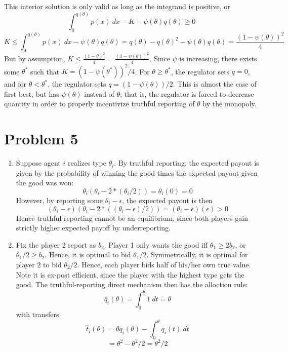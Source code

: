 \documentclass[10pt,letter]{article}
\begin{document}
\begin{enumerate}[label=(\alph*)]
This interior solution is only valid as long as the integrand is positive, or
\[ \int_0^{q(\theta)}p(x) \ dx - K - \psi(\theta) q(\theta) \ge 0 \]
\[ K \le \int_0^{q(\theta)}p(x) \ dx - \psi(\theta) q(\theta) = q(\theta) - q(\theta)^2 - \psi(\theta)q(\theta) = \frac{(1-\psi(\theta))^2}{4} \]
But by assumption, $K \le \frac{(1-\underline{\theta})^2}{4} = \frac{(1-\psi(\underline{\theta}))^2}{4}$. Since $\psi$ is increasing, there exists some $\theta^*$ such that $K = (1-\psi(\theta^*))^2/4$. For $\theta \ge \theta^*$, the regulator sets $q = 0$, and for $\theta < \theta^*$, the regulator sets $q = (1-\psi(\theta))/2$.
This is almost the case of first best, but has $\psi(\theta)$ instead of $\theta$; that is, the regulator is forced to decrease quantity in order to properly incentivize truthful reporting of $\theta$ by the monopoly.
\end{enumerate}
\section*{Problem 5}
\begin{enumerate}[label=(\alph*)]
\item Suppose agent $i$ realizes type $\theta_i$. By truthful reporting, the expected payout is given by the probability of winning the good times the expected payout given the good was won:
\[ \theta_i \left(\theta_i - 2 * (\theta_i/2)\right) = \theta_i (0) = 0 \]
However, by reporting some $\theta_i - \epsilon$, the expected payout is then
\[ (\theta_i - \epsilon) \left(\theta_i  - 2 * ((\theta_i - \epsilon)/2)\right) = (\theta_i - \epsilon) (\epsilon) > 0 \]
Hence truthful reporting cannot be an equilibrium, since both players gain strictly higher expected payoff by underreporting.
\item Fix the player 2 report as $b_2$. Player 1 only wants the good iff $\theta_1 \ge 2b_2$, or $\theta_1/2 \ge b_2$. Hence, it is optimal to bid $\theta_1/2$. Symmetrically, it is optimal for player 2 to bid $\theta_2/2$. Hence, each player bids half of his/her own true value. Note it is ex-post efficient, since the player with the highest type gets the good. The truthful-reporting direct mechanism then has the alloction rule:
\[ \bar{q}_i(\theta) = \int_0^{\theta} 1 \ dt = \theta  \]
with transfers
\[ \bar{t}_i(\theta) = \theta \bar{q}_i(\theta) - \int_0^\theta \bar{q}_i(t) \ dt \]
\[ = \theta^2 - \theta^2/2 = \theta^2/2 \]
\end{enumerate}
\end{document}
